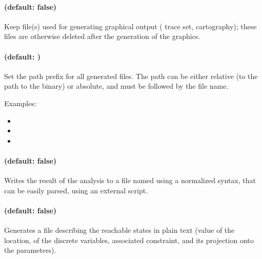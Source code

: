 \paragraph{ (default: false)}
Keep file(s) used for generating graphical output (\eg{} trace set, cartography); these files are otherwise deleted after the generation of the graphics.


\paragraph{ (default: )}
Set the path prefix for all generated files.
The path can be either relative (to the path to the \binimitator{} binary) or absolute, and must be followed by the file name.

Examples:
\begin{itemize}
	\item {}
	\item {}
	\item {}
\end{itemize}


\paragraph{ (default: false)}
Writes the result of the analysis to a file named  using a normalized syntax, that can be easily parsed, \eg{} using an external script.


\paragraph{ (default: false)}
Generates a file  describing the reachable states in plain text (value of the location, of the discrete variables, associated constraint, and its projection onto the parameters).


